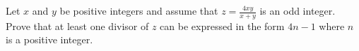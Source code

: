 Let $x$ and $y$ be positive integers and assume that $z=\frac{4xy}{x+y}$ is an odd integer. Prove that at least one divisor of $z$ can be expressed in the form $4n-1$ where $n$ is a positive integer.